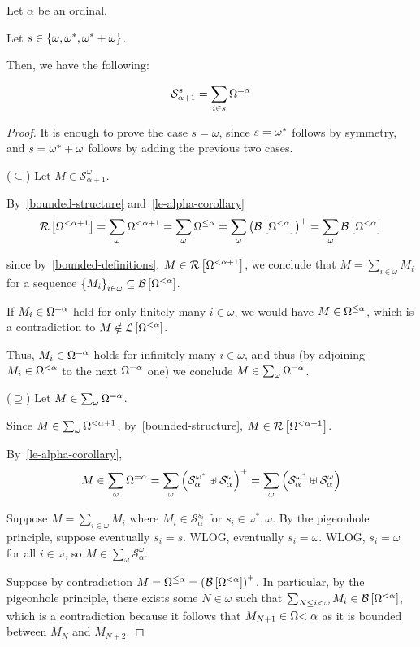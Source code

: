 \begin{lemma}\label{shape-structure-successor}
  Let $\alpha$ be an ordinal.

  Let $s \in \left\{ {\omega, \omega^\ast, \omega^\ast + \omega} \right\}$.

  Then, we have the following:

  \[
    \mathcal{S}^{s}_{\alpha + 1} = \sum_{i \in s}{\Omega^{= \alpha}}
  \]
\end{lemma}

\begin{proof}
  It is enough to prove the case $s = \omega$,
  since $s = \omega^\ast$ follows by symmetry,
  and $s = \omega^\ast + \omega$ follows by adding the previous two cases.

  ($\subseteq$) Let $M \in \mathcal{S}^{\omega}_{\alpha + 1}$.

  By~\cref{bounded-structure} and~\cref{le-alpha-corollary}
  \[
    \mathcal{R} \left[ {{\Omega^{< \alpha + 1}}} \right]
    = \sum_{\omega}{\Omega^{< \alpha + 1}}
    = \sum_{\omega}{\Omega^{\le \alpha}}
    = \sum_{\omega}{\left( {\mathcal{B} \left[ {{\Omega^{< \alpha}}} \right]} \right)^+}
    = \sum_{\omega}{\mathcal{B} \left[ {{\Omega^{< \alpha}}} \right]}
  \]

  since by~\cref{bounded-definitions}, $M \in \mathcal{R} \left[ {{\Omega^{< \alpha + 1}}} \right]$,
  we conclude that $M = \sum_{i \in \omega}{M_i}$ for a sequence
  $\left\{ {M_i} \right\}_{i \in \omega} \subseteq \mathcal{B} \left[ {{\Omega^{< \alpha}}} \right]$.

  If $M_i \in \Omega^{= \alpha}$ held for only finitely many $i \in \omega$,
  we would have $M \in \Omega^{\le \alpha}$, which is a contradiction
  to $M \notin \mathcal{L} \left[ {{\Omega^{< \alpha}}} \right]$.

  Thus, $M_i \in \Omega^{= \alpha}$ holds
  for infinitely many $i \in \omega$, and thus (by adjoining $M_i \in \Omega^{< \alpha}$
  to the next $\Omega^{= \alpha}$ one) we conclude $M \in \sum_{\omega}{\Omega^{= \alpha}}$.

  ($\supseteq$) Let $M \in \sum_{\omega}{\Omega^{= \alpha}}$.

  Since $M \in \sum_{\omega} {\Omega^{< \alpha + 1}}$, by~\cref{bounded-structure},
  $M \in \mathcal{R} \left[ {{\Omega^{< \alpha + 1}}} \right]$.

  By~\cref{le-alpha-corollary},
  \[
    M \in \sum_{\omega}{\Omega^{= \alpha}}
    = \sum_{\omega} \left( { \mathcal{S}^{\omega^\ast}_{\alpha} \uplus \mathcal{S}^{\omega}_{\alpha} } \right)^+
    = \sum_{\omega} \left( { \mathcal{S}^{\omega^\ast}_{\alpha} \uplus \mathcal{S}^{\omega}_{\alpha} } \right)
  \]

  Suppose $M = \sum_{i \in \omega}{M_i}$ where $M_i \in \mathcal{S}^{s_i}_{\alpha}$
  for $s_i \in {\omega^\ast, \omega}$. By the pigeonhole principle,
  suppose eventually $s_i = s$. WLOG, eventually $s_i = \omega$. WLOG,
  $s_i = \omega$ for all $i \in \omega$, so $M \in \sum_{\omega} \mathcal{S}^{\omega}_{\alpha}$.

  Suppose by contradiction $M = \Omega^{\le \alpha} = \left( {\mathcal{B} \left[ {{\Omega^{< \alpha}}} \right]} \right)^+$.
  In particular, by the pigeonhole principle, there exists some $N \in \omega$
  such that $\sum_{N \le i < \omega} M_i \in \mathcal{B} \left[ {{\Omega^{< \alpha}}} \right]$,
  which is a contradiction because it follows that $M_{N+1} \in \Omega{< \alpha}$ as it is bounded
  between $M_N$ and $M_{N+2}$.
\end{proof}


